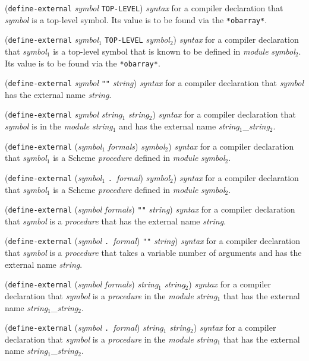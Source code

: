 \documentclass[10pt,twocolumn]{article}
\begin{document}
(\texttt{define-external} \emph{symbol} \texttt{TOP-LEVEL})
\emph{syntax} for a compiler declaration that \emph{symbol} is a
top-level symbol.  Its value is to be found via the
\texttt{*obarray*}.

(\texttt{define-external} \emph{symbol}$_1$ \texttt{TOP-LEVEL}
\emph{symbol}$_2$) \emph{syntax} for a compiler declaration that
\emph{symbol}$_1$ is a top-level symbol that is known to be defined in
\emph{module} \emph{symbol}$_2$.  Its value is to be found via the
\texttt{*obarray*}.

(\texttt{define-external} \emph{symbol} \texttt{""} \emph{string})
\emph{syntax} for a compiler declaration that \emph{symbol} has the
external name \emph{string}.

(\texttt{define-external} \emph{symbol} \emph{string}$_1$
\emph{string}$_2$) \emph{syntax} for a compiler declaration that
\emph{symbol} is in the \emph{module} \emph{string}$_1$ and has the
external name \emph{string}$_1$\_\emph{string}$_2$.

(\texttt{define-external} (\emph{symbol}$_1$ \emph{formals})
\emph{symbol}$_2$) \emph{syntax} for a compiler declaration that
\emph{symbol}$_1$ is a Scheme \emph{procedure} defined in
\emph{module} \emph{symbol}$_2$.

(\texttt{define-external} (\emph{symbol}$_1$
\texttt{.}\ \emph{formal}) \emph{symbol}$_2$) \emph{syntax} for a
compiler declaration that \emph{symbol}$_1$ is a Scheme
\emph{procedure} defined in \emph{module} \emph{symbol}$_2$.

(\texttt{define-external} (\emph{symbol} \emph{formals}) \texttt{""}
\emph{string}) \emph{syntax} for a compiler declaration that
\emph{symbol} is a \emph{procedure} that has the external name
\emph{string}.

(\texttt{define-external} (\emph{symbol} \texttt{.}\ \emph{formal})
\texttt{""} \emph{string}) \emph{syntax} for a compiler declaration
that \emph{symbol} is a \emph{procedure} that takes a variable number
of arguments and has the external name \emph{string}.

(\texttt{define-external} (\emph{symbol} \emph{formals})
\emph{string}$_1$ \emph{string}$_2$) \emph{syntax} for a compiler
declaration that \emph{symbol} is a \emph{procedure} in the
\emph{module} \emph{string}$_1$ that has the external name
\emph{string}$_1$\_\emph{string}$_2$.

(\texttt{define-external} (\emph{symbol} \texttt{.}\ \emph{formal})
\emph{string}$_1$ \emph{string}$_2$) \emph{syntax} for a compiler
declaration that \emph{symbol} is a \emph{procedure} in the
\emph{module} \emph{string}$_1$ that has the external name
\emph{string}$_1$\_\emph{string}$_2$.
\end{document}
